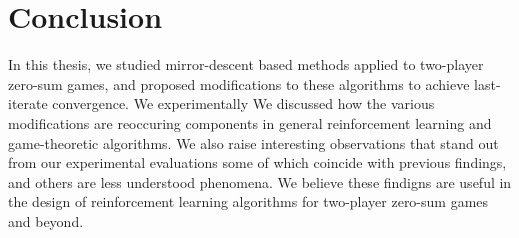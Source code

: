 \chapter{Conclusion}
In this thesis, we studied mirror-descent based methods applied to two-player zero-sum games, and
proposed modifications to these algorithms to achieve last-iterate convergence.
We experimentally We discussed how the various modifications are reoccuring components in general
reinforcement learning and game-theoretic algorithms.
We also raise interesting observations that stand out from our experimental evaluations some of
which coincide with previous findings, and others are less understood phenomena.
We believe these findigns are useful in the design of reinforcement learning algorithms for
two-player zero-sum games and beyond.
